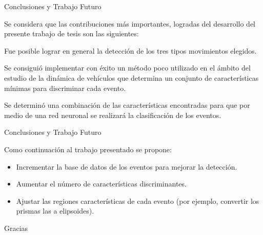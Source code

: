 \documentclass[14pt]{beamer}
\begin{document}



\begin{frame}{Conclusiones y Trabajo Futuro}

Se considera que las contribuciones más importantes, logradas del desarrollo del presente trabajo de tesis son las siguientes:
\vskip 10pt
\begin{itemize}
{\small
\item \justifying Fue posible lograr en general la detección de los tres tipos movimientos elegidos.

\item \justifying Se consiguió implementar con éxito un método poco utilizado en el ámbito del estudio de la dinámica de vehículos que determina un conjunto de características mínimas para discriminar cada evento.

\item \justifying Se determinó una combinación de las características encontradas para que por medio de una red neuronal se realizará la clasificación de los eventos.
}

\end{itemize} 

\end{frame}



\begin{frame}{Conclusiones y Trabajo Futuro}

Como continuación al trabajo presentado se propone:
\vskip 10pt
\begin{itemize}
\item \justifying Incrementar la base de datos de los eventos para mejorar la detección.
\item \justifying Aumentar el número de características discriminantes.
\item \justifying Ajustar las regiones características de cada evento (por ejemplo, convertir los prismas las a elipsoides).
\end{itemize}

\end{frame}

\begin{frame}{}
\centering
\vfill
{\selectfont \Huge Gracias}
\vfill
\end{frame}
\end{document}
